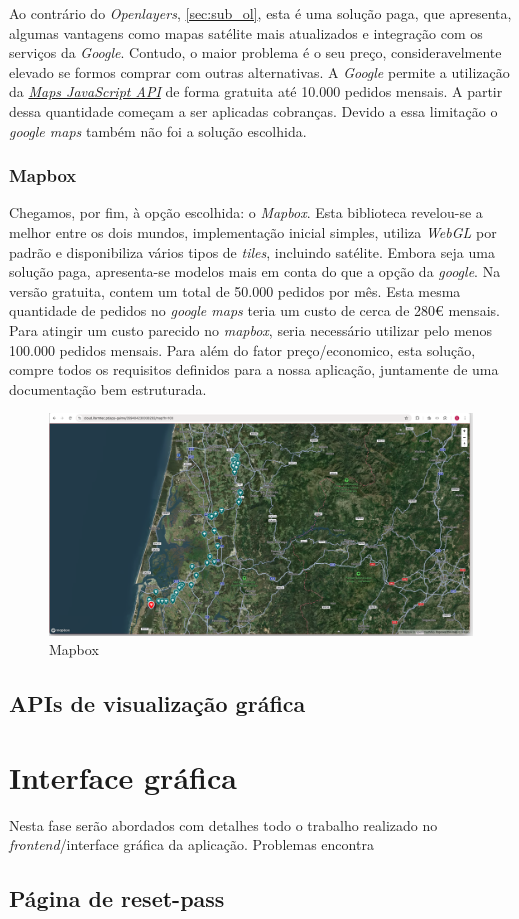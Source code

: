Ao contrário do \textit{Openlayers}, \ref{sec:sub_ol}, esta é uma solução paga, que apresenta, algumas vantagens como mapas satélite mais atualizados e integração com os serviços da \textit{Google}. Contudo, o maior problema é o seu preço, consideravelmente elevado se formos comprar com outras alternativas. A \textit{Google} permite a utilização da \href{https://developers.google.com/maps/documentation/javascript}{\textit{Maps JavaScript API}} de forma gratuita até 10.000 pedidos mensais. A partir dessa quantidade começam a ser aplicadas cobranças. Devido a essa limitação o \textit{google maps} também não foi a solução escolhida.

\subsubsection{\textbf{Mapbox}}\label{sec:mapbox}
Chegamos, por fim, à opção escolhida: o \textit{Mapbox}. Esta biblioteca revelou-se a melhor entre os dois mundos, implementação inicial simples, utiliza \textit{WebGL} por padrão e disponibiliza vários tipos de \textit{tiles}, incluindo satélite. Embora seja uma solução paga, apresenta-se modelos mais em conta do que a opção da \textit{google}. Na versão gratuita, contem um total de 50.000 pedidos por mês. Esta mesma quantidade de pedidos no \textit{google maps} teria um custo de cerca de 280€ mensais. Para atingir um custo parecido no \textit{mapbox}, seria necessário utilizar pelo menos 100.000 pedidos mensais. Para além do fator preço/economico, esta solução, compre todos os requisitos definidos para a nossa aplicação, juntamente de uma documentação bem estruturada.

\begin{figure}[h!]
    \centering
    \includegraphics[width=\textwidth]{figs/mapbox.png}
    \caption[mapbox]{Mapbox}
    \label{fig:mapbox}
\end{figure}

\subsection{APIs de visualização gráfica}

\clearpage
\section{Interface gráfica}\label{sec:frontend}
    Nesta fase serão abordados com detalhes todo o trabalho realizado no \textit{frontend}/interface gráfica da aplicação. Problemas encontra

\subsection{Página de reset-pass}